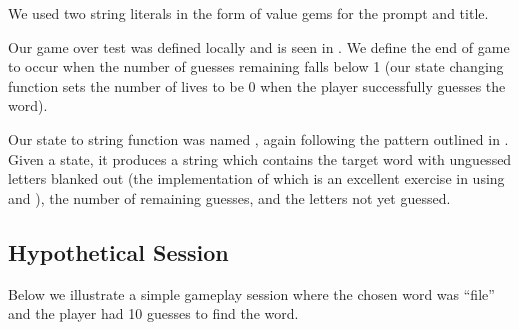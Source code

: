 We used two string literals in the form of value gems for the prompt and title.

Our game over test was defined locally and is seen in .  We define the end of game to occur when the number of guesses remaining falls below 1 (our state changing function  sets the number of lives to be 0 when the player successfully guesses the word).

Our state to string function was named , again following the pattern outlined in \cite{Curtis05}.  Given a state, it produces a string which contains the target word with unguessed letters blanked out (the implementation of which is an excellent exercise in using  and ), the number of remaining guesses, and the letters not yet guessed.

\subsection{Hypothetical Session}

Below we illustrate a simple gameplay session where the chosen word was ``file'' and the player had 10 guesses to find the word.

